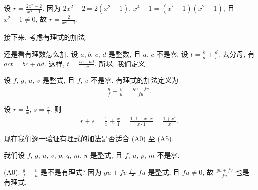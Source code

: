 \begin{example}
    设 $r = \frac{2x^2 - 2}{x^4 - 1}$. 因为 $2x^2 - 2 = 2(x^2 - 1)$, $x^4 - 1 = (x^2 + 1)(x^2 - 1)$, 且 $x^2 - 1 \neq 0$, 故 $r = \frac{2}{x^2 + 1}$.
\end{example}

接下来, 考虑有理式的加法.

还是看有理数怎么加. 设 $a$, $b$, $c$, $d$ 是整数, 且 $a$, $c$ 不是零. 设 $t = \frac{b}{a} + \frac{d}{c}$. 去分母, 有 $act = bc + ad$. 这样, $t = \frac{bc + ad}{ac}$. 所以, 我们定义
\begin{definition}
    设 $f$, $g$, $u$, $v$ 是整式, 且 $f$, $u$ 不是零. 有理式的加法定义为
    \begin{align*}
        \frac{g}{f} + \frac{v}{u} = \frac{gu + fv}{fu}.
    \end{align*}
\end{definition}

\begin{example}
    设 $r = \frac{1}{x}$, $s = \frac{x}{1}$. 则
    \begin{align*}
        r + s = \frac{1}{x} + \frac{x}{1} = \frac{1 \cdot 1 + x \cdot x}{x \cdot 1} = \frac{1 + x^2}{x}.
    \end{align*}
\end{example}

现在我们逐一验证有理式的加法是否适合 (A0) 至 (A5).

我们设 $f$, $g$, $u$, $v$, $p$, $q$, $m$, $n$ 是整式, 且 $f$, $u$, $p$, $m$ 不是零.

(A0): $\frac{g}{f} + \frac{v}{u}$ 是不是有理式? 因为 $gu + fv$ 与 $fu$ 是整式, 且 $fu \neq 0$, 故 $\frac{gu + fv}{fu}$ 也是有理式.

